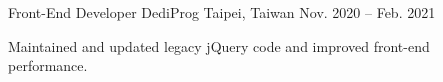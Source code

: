 \resumeExperience
  {Front-End Developer}
  {DediProg}
  {Taipei, Taiwan}
  {Nov. 2020 -- Feb. 2021}
  {
    \item Maintained and updated legacy jQuery code and improved front-end performance.
  }
